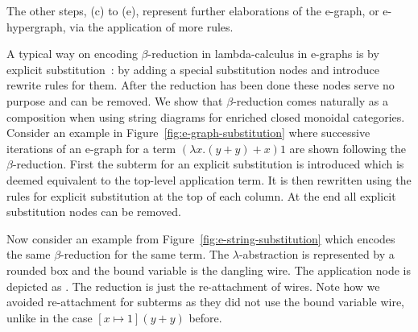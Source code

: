 \documentclass[peerreviewcls]{IEEEtran}
\begin{document}
The other steps, (c) to (e), represent further elaborations of the e-graph, or e-hypergraph, via the application of more rules.


A typical way on encoding $\beta$-reduction in lambda-calculus in e-graphs is by explicit substitution~\cite{EggPaper,koehler2022sketchguided}: by adding a special substitution nodes and introduce rewrite rules for them.
After the reduction has been done these nodes serve no purpose and can be removed.
We show that $\beta$-reduction comes naturally as a composition when using string diagrams for enriched closed monoidal categories.
Consider an example in Figure~\ref{fig:e-graph-substitution} where successive iterations of an e-graph for a term $(\lambda x . (y + y) + x) 1$ are shown following the $\beta$-reduction.
First the subterm for an explicit substitution is introduced which is deemed equivalent to the top-level application term.
It is then rewritten using the rules for explicit substitution at the top of each column.
At the end all explicit substitution nodes can be removed.

Now consider an example from Figure~\ref{fig:e-string-substitution} which encodes the same $\beta$-reduction for the same term.
The $\lambda$-abstraction is represented by a rounded box and the bound variable is the dangling wire.
The application node is depicted as 
. 
The reduction is just the re-attachment of wires.
Note how we avoided re-attachment for subterms as they did not use the bound variable wire, unlike in the case $[x \mapsto 1](y+y)$ before.
\end{document}
